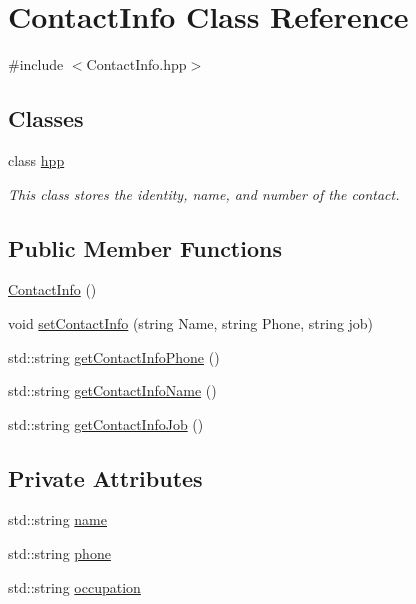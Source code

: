 \hypertarget{classContactInfo}{}\section{Contact\+Info Class Reference}
\label{classContactInfo}


{\ttfamily \#include $<$Contact\+Info.\+hpp$>$}

\subsection*{Classes}
\begin{DoxyCompactItemize}
\item 
class \hyperlink{classContactInfo_1_1hpp}{hpp}
\begin{DoxyCompactList}\small\item\em This class stores the identity, name, and number of the contact. \end{DoxyCompactList}\end{DoxyCompactItemize}
\subsection*{Public Member Functions}
\begin{DoxyCompactItemize}
\item 
\hyperlink{classContactInfo_a4c76e92e4ef880a06af1404da32b3fa7}{Contact\+Info} ()
\item 
void \hyperlink{classContactInfo_a870acb96096d987a910fa3cc8022ac8f}{set\+Contact\+Info} (string Name, string Phone, string job)
\item 
std\+::string \hyperlink{classContactInfo_affb67018c3d052b91392eea9db29704c}{get\+Contact\+Info\+Phone} ()
\item 
std\+::string \hyperlink{classContactInfo_af07393e83fa33e470c40c419613bacf1}{get\+Contact\+Info\+Name} ()
\item 
std\+::string \hyperlink{classContactInfo_a8735facf207013b5f92f534cc6035242}{get\+Contact\+Info\+Job} ()
\end{DoxyCompactItemize}
\subsection*{Private Attributes}
\begin{DoxyCompactItemize}
\item 
std\+::string \hyperlink{classContactInfo_ae43d14159125871edf591d7a16a9aa15}{name}
\item 
std\+::string \hyperlink{classContactInfo_a74d162bbb4a96dff6794e644e6d62e38}{phone}
\item 
std\+::string \hyperlink{classContactInfo_a7126750ab0c8294f092278639d51c68a}{occupation}
\end{DoxyCompactItemize}


